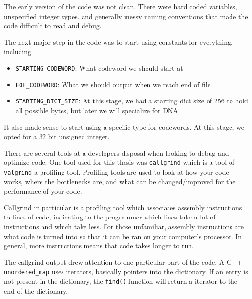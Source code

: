 \documentclass[12pt,twoside]{reedthesis}
\providecommand{\tightlist}{%
  \setlength{\itemsep}{0pt}\setlength{\parskip}{0pt}}
\begin{document}
The early version of the code was not clean. There were hard coded variables, unspecified integer types, and generally messy naming conventions that made the code difficult to read and debug.

The next major step in the code was to start using constants for everything, including
\begin{itemize}
\tightlist
\item
  \texttt{STARTING\_CODEWORD}: What codeword we should start at
\item
  \texttt{EOF\_CODEWORD}: What we should output when we reach end of file
\item
  \texttt{STARTING\_DICT\_SIZE}: At this stage, we had a starting dict size of 256 to hold all possible bytes, but later we will specialize for DNA
\end{itemize}
It also made sense to start using a specific type for codewords. At this stage, we opted for a 32 bit unsigned integer.

There are several tools at a developers disposal when looking to debug and optimize code. One tool used for this thesis was \texttt{callgrind} which is a tool of \texttt{valgrind} a profiling tool. Profiling tools are used to look at how your code works, where the bottlenecks are, and what can be changed/improved for the performance of your code.

Callgrind in particular is a profiling tool which associates assembly instructions to lines of code, indicating to the programmer which lines take a lot of instructions and which take less. For those unfamiliar, assembly instructions are what code is turned into so that it can be ran on your computer's processor. In general, more instructions means that code takes longer to run.

The callgrind output drew attention to one particular part of the code. A C++ \texttt{unordered\_map} uses iterators, basically pointers into the dictionary. If an entry is not present in the dictionary, the \texttt{find()} function will return a iterator to the end of the dictionary.
\end{document}

